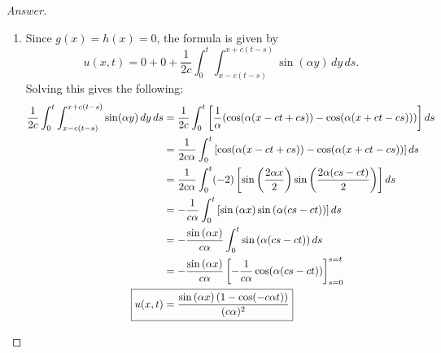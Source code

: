 \documentclass{article}
\theoremstyle{definition}
\renewcommand\qedsymbol{$\blacksquare$}
\newenvironment{ans}{\begin{proof}[Answer]\renewcommand{\qedsymbol}{}}{\end{proof}}
\begin{document}
	\begin{ans}
		\begin{enumerate}[(1), series=answers]
            \item Since $g(x) = h(x) = 0$, the formula is given by \[u(x,t) = 0 + 0 + \frac{1}{2c}\int_0^t\int_{x-c(t-s)}^{x+c(t-s)}\sin(\alpha y)\,dy\,ds.\]
            Solving this gives the following:
            \begin{align*}
                \frac{1}{2c}\int_0^t\int_{x-c(t-s)}^{x+c(t-s)}\sin(\alpha y)\,dy\,ds
                &= \frac{1}{2c}\int_0^t\left[ \frac{1}{\alpha}(\cos(\alpha(x-ct+cs))-\cos(\alpha(x+ct-cs)))\right]ds\\
                &= \frac{1}{2c\alpha}\int_0^t\left[\cos(\alpha(x-ct+cs))-\cos(\alpha(x+ct-cs))\right]ds\\
                &= \frac{1}{2c\alpha}\int_0^t(-2)\left[\sin\left(\frac{2\alpha x}{2}\right)\sin\left(\frac{2\alpha(cs-ct)}{2}\right)\right]ds\\
                &= -\frac{1}{c\alpha}\int_0^t\left[\sin\left(\alpha x\right)\sin\left(\alpha(cs-ct)\right)\right]ds\\
                &= -\frac{\sin\left(\alpha x\right)}{c\alpha}\int_0^t\sin\left(\alpha(cs-ct)\right)ds\\
                &= -\frac{\sin\left(\alpha x\right)}{c\alpha}\left[-\frac{1}{c\alpha}\cos(\alpha(cs-ct))\right]_{s=0}^{s=t}\\
                \Aboxed{u(x,t) &=\frac{\sin\left(\alpha x\right)\left(1-\cos(-c\alpha t)\right)}{(c\alpha)^2}}
            \end{align*}


\end{enumerate}
\end{ans}
\end{document}
